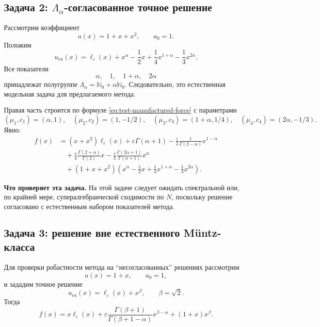 \documentclass[12pt,a4paper]{article}
\theoremstyle{definition}
\newcommand{\eps}{\varepsilon}
\newcommand{\Nc}{\mathbb{N}_0}
\begin{document}
\subsection{Задача 2: \texorpdfstring{$\Lambda_\alpha$}{Lambda}-согласованное точное решение}

Рассмотрим коэффициент
\[
a(x)=1+x+x^2,
\qquad
a_0=1.
\]
Положим
\begin{equation}
\label{eq:test2-uex}
u_{\mathrm{ex}}(x)
=
\ell_\eps(x)
+
x^\alpha
-\frac12 x
+\frac14 x^{1+\alpha}
-\frac13 x^{2\alpha}.
\end{equation}
Все показатели
\[
\alpha,\quad 1,\quad 1+\alpha,\quad 2\alpha
\]
принадлежат полугруппе $\Lambda_\alpha=\Nc+\alpha\Nc$.
Следовательно, это естественная модельная задача для предлагаемого метода.

Правая часть строится по формуле \eqref{eq:test-manufactured-force}
с параметрами
\[
(\mu_1,c_1)=(\alpha,1),\quad
(\mu_2,c_2)=(1,-1/2),\quad
(\mu_3,c_3)=(1+\alpha,1/4),\quad
(\mu_4,c_4)=(2\alpha,-1/3).
\]
Явно:
\begin{equation}
\label{eq:test2-f}
\begin{aligned}
f(x)
&=
(x+x^2)\ell_\eps(x)
+
\eps\Gamma(\alpha+1)
-\frac{\eps}{2}\frac{1}{\Gamma(2-\alpha)}x^{1-\alpha}
\\
&\quad
+\frac{\eps}{4}\frac{\Gamma(2+\alpha)}{\Gamma(2)}x
-\frac{\eps}{3}\frac{\Gamma(2\alpha+1)}{\Gamma(\alpha+1)}x^\alpha
\\
&\quad
+(1+x+x^2)
\left(
x^\alpha
-\frac12 x
+\frac14 x^{1+\alpha}
-\frac13 x^{2\alpha}
\right).
\end{aligned}
\end{equation}

\medskip
\noindent
\textbf{Что проверяет эта задача.}
На этой задаче следует ожидать спектральной или, по крайней мере,
супералгебраической сходимости по $N$, поскольку решение согласовано
с естественным набором показателей метода.

\subsection{Задача 3: решение вне естественного Müntz-класса}

Для проверки робастности метода на ``несогласованных'' решениях рассмотрим
\[
a(x)=1+x,
\qquad
a_0=1,
\]
и зададим точное решение
\begin{equation}
\label{eq:test3-uex}
u_{\mathrm{ex}}(x)
=
\ell_\eps(x)+x^\beta,
\qquad
\beta=\sqrt{2}.
\end{equation}
Тогда
\begin{equation}
\label{eq:test3-f}
f(x)
=
x\ell_\eps(x)
+
\eps \frac{\Gamma(\beta+1)}{\Gamma(\beta+1-\alpha)}x^{\beta-\alpha}
+
(1+x)x^\beta.
\end{equation}
\end{document}
